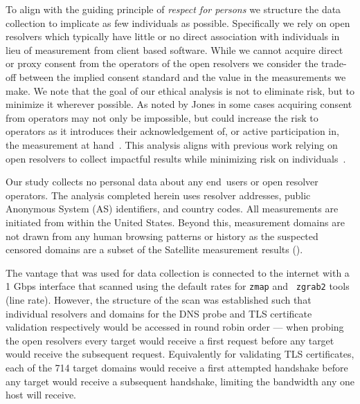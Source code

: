 To align with the guiding principle of \textit{respect for persons} we
structure the data collection to implicate as few individuals as possible.
Specifically we rely on open resolvers which typically have little or no direct
association with individuals in lieu of measurement from client based
software. While we cannot acquire direct or proxy consent from the operators of
the open resolvers we consider the trade-off between the implied consent
standard and the value in the measurements we make. 
We note that the goal of our ethical analysis is not to eliminate risk, but to
minimize it wherever possible. As noted by Jones \etal in some cases acquiring
consent from operators may not only be impossible, but could increase the risk to
operators as it introduces their acknowledgement of, or active participation
in, the measurement at hand~\cite{jones2015ethical}. This analysis aligns with
previous work relying on open resolvers to collect impactful results while
minimizing risk on
individuals~\cite{pearce2017global,scott2016satellite,sundara2020censored}.

Our study collects no personal data about any end~users or open
resolver operators. The analysis completed herein uses resolver addresses,
public Anonymous System (AS) identifiers, and country codes.  All measurements
are initiated from within the United States.
Beyond this,
measurement domains are not drawn from any human browsing patterns or history
as the suspected censored domains are a subset of the Satellite measurement
results (\cf {}).

The vantage that was used for data collection is connected to the internet with
a 1 Gbps interface that scanned using the default rates for {\tt zmap} and {\tt
zgrab2} tools (line rate). However, the structure of the scan was established
such that individual resolvers and domains for the DNS probe and TLS
certificate validation respectively would be accessed in round robin order ---
\ie when probing the open resolvers every target would receive a first
request before any target would receive the subsequent request.  Equivalently
for validating TLS certificates, each of the 714 target domains would receive
a first attempted handshake before any target would receive a subsequent
handshake, limiting the bandwidth any one host will receive.

